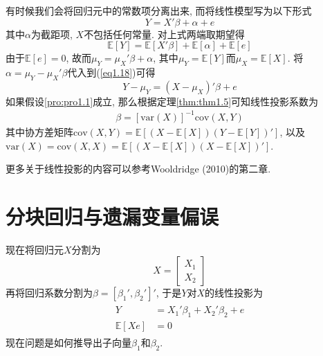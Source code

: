 \documentclass[cn, 12pt, math=mtpro2, bibstyle=apa, blue, twocol]{elegantbook}
\newcommand{\E}{\mathbb{E}}
\newcommand{\var}{\text{var}}
\begin{document}
有时候我们会将回归元中的常数项分离出来, 而将线性模型写为以下形式
\begin{equation}\label{eq1.18}
  Y=X'\beta+\alpha+e
\end{equation}
其中$\alpha$为截距项, $X$不包括任何常量. 对上式两端取期望得
$$\E[Y]=\E[X'\beta]+\E[\alpha]+\E[e]$$
由于$\E[e]=0$, 故而$\mu_Y=\mu_X'\beta+\alpha$, 其中$\mu_Y=\E[Y]$而$\mu_X=\E[X]$. 将$\alpha=\mu_Y-\mu_X'\beta$代入到(\ref{eq1.18})可得
$$Y-\mu_Y=(X-\mu_X)'\beta+e$$
如果假设\ref{pro:pro1.1}成立, 那么根据定理\ref{thm:thm1.5}可知线性投影系数为
\begin{align*}
\beta=[\var(X)]^{-1}\text{cov}(X,Y)
\end{align*}
其中协方差矩阵$\text{cov}(X,Y)=\E[(X-\E[X])(Y-\E[Y])']$, 以及$\var(X)=\text{cov}(X,X)=\E[(X-\E[X])(X-\E[X])']$.

更多关于线性投影的内容可以参考Wooldridge (2010)的第二章.
\section{分块回归与遗漏变量偏误}
现在将回归元$X$分割为
\begin{equation}\label{eq1.22}
X=\begin{bmatrix}
      X_1 \\
      X_2
    \end{bmatrix}
\end{equation}
再将回归系数分割为$\beta=[\beta_1',\beta_2']'$, 于是$Y$对$X$的线性投影为
\begin{align}
\begin{split}
Y&=X_1'\beta_1+X_2'\beta_2+e \\
\E[Xe]&=0
\end{split}
\label{eq1.20}
\end{align}
现在问题是如何推导出子向量$\beta_1$和$\beta_2$.
\end{document}
